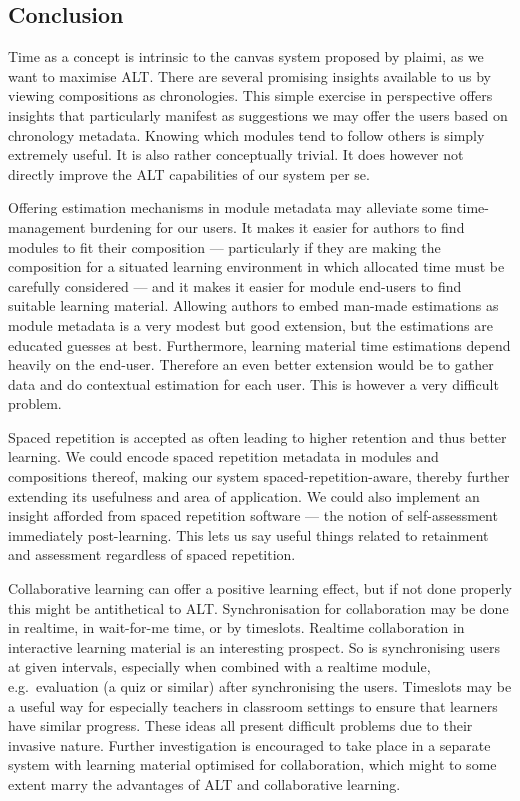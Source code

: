\documentclass{article}
\begin{document}
\begin{multicols}{2}
 \section{Conclusion}
Time as a concept is intrinsic to the canvas system proposed by plaimi, as we 
want to maximise ALT. There are several promising insights available to us by 
viewing compositions as chronologies. This simple exercise in perspective 
offers insights that particularly manifest as suggestions we may offer the 
users based on chronology metadata. Knowing which modules tend to follow 
others is simply extremely useful. It is also rather conceptually trivial. It 
does however not directly improve the ALT capabilities of our system per se.

Offering estimation mechanisms in module metadata may alleviate some 
time-management burdening for our users. It makes it easier for authors to 
find modules to fit their composition --- particularly if they are making the 
composition for a situated learning environment in which allocated time must 
be carefully considered --- and it makes it easier for module end-users to 
find suitable learning material. Allowing authors to embed man-made 
estimations as module metadata is a very modest but good extension, but the 
estimations are educated guesses at best. Furthermore, learning material time 
estimations depend heavily on the end-user. Therefore an even better extension 
would be to gather data and do contextual estimation for each user. This is 
however a very difficult problem.

Spaced repetition is accepted as often leading to higher retention and thus 
better learning. We could encode spaced repetition metadata in modules and 
compositions thereof, making our system spaced-repetition-aware, thereby 
further extending its usefulness and area of application. We could also 
implement an insight afforded from spaced repetition software --- the notion 
of self-assessment immediately post-learning. This lets us say useful things 
related to retainment and assessment regardless of spaced repetition.

Collaborative learning can offer a positive learning effect, but if not done 
properly this might be antithetical to ALT. Synchronisation for collaboration 
may be done in realtime, in wait-for-me time, or by timeslots. Realtime 
collaboration in interactive learning material is an interesting prospect. So 
is synchronising users at given intervals, especially when combined with a 
realtime module, e.g.\ evaluation (a quiz or similar) after synchronising the 
users. Timeslots may be a useful way for especially teachers in classroom 
settings to ensure that learners have similar progress. These ideas all 
present difficult problems due to their invasive nature. Further investigation 
is encouraged to take place in a separate system with learning material 
optimised for collaboration, which might to some extent marry the advantages 
of ALT and collaborative learning.


\end{multicols}
\end{document}
